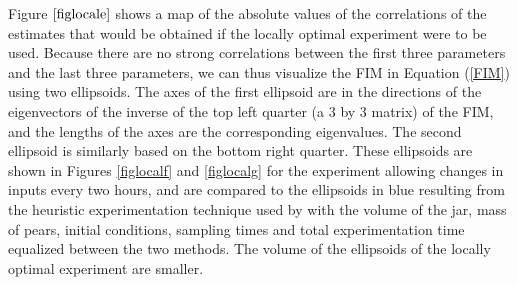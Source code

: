 Figure $\ref{figlocale}$ shows a map of the absolute values of the correlations of the estimates that would be obtained if the locally optimal experiment were to be used. Because there are no strong correlations between the first three parameters and the last three parameters, we can thus visualize the FIM in Equation (\ref{FIM}) using two ellipsoids. {\color{red}The axes of the first ellipsoid are in the directions of the eigenvectors of the inverse of the top left quarter (a 3 by 3 matrix) of the FIM, and the lengths of the axes are the corresponding eigenvalues. The second ellipsoid is similarly based on the bottom right quarter.} These ellipsoids are shown in Figures \ref{figlocalf} and \ref{figlocalg} for the experiment allowing changes in inputs every two hours, {\color{red}and are compared to the ellipsoids in blue resulting from the heuristic experimentation technique used by \textcite{ho} with the volume of the jar, mass of pears, initial conditions, sampling times and total experimentation time equalized between the two methods. The volume of the ellipsoids of the locally optimal experiment are smaller.}
